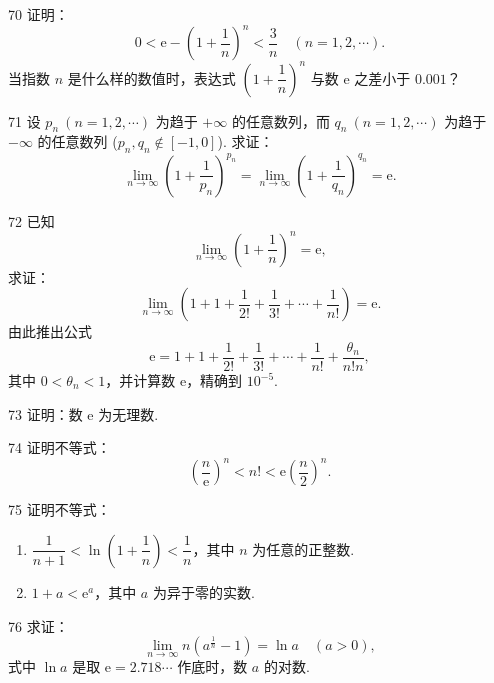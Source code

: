 \begin{prob}[M]{70}
证明：
\[
0 < \mathrm{e} - \left(1 + \frac{1}{n}\right)^n < \frac{3}{n} \quad (n=1,2,\cdots).
\]
当指数 $n$ 是什么样的数值时，表达式 $\left(1 + \dfrac{1}{n}\right)^n$ 与数 $\mathrm{e}$ 之差小于 $0.001$？
\end{prob}

\begin{prob}[M]{71}
设 $p_n\ (n=1,2,\cdots)$ 为趋于 $+\infty$ 的任意数列，而 $q_n\ (n=1,2,\cdots)$ 为趋于 $-\infty$ 的任意数列 ($p_n, q_n \notin [-1,0]$). 求证：
\[
\lim_{n\to\infty} \left(1 + \frac{1}{p_n}\right)^{p_n} = \lim_{n\to\infty} \left(1 + \frac{1}{q_n}\right)^{q_n} = \mathrm{e}.
\]
\end{prob}

\begin{prob}[L]{72}
已知
\[
\lim_{n\to\infty} \left(1 + \frac{1}{n}\right)^n = \mathrm{e},
\]
求证：
\[
\lim_{n\to\infty} \left(1 + 1 + \frac{1}{2!} + \frac{1}{3!} + \cdots + \frac{1}{n!}\right) = \mathrm{e}.
\]
由此推出公式
\[
\mathrm{e} = 1 + 1 + \frac{1}{2!} + \frac{1}{3!} + \cdots + \frac{1}{n!} + \frac{\theta_n}{n!n}, \tag{$*$}
\]
其中 $0 < \theta_n < 1$，并计算数 $\mathrm{e}$，精确到 $10^{-5}$.
\end{prob}

\begin{prob}[M]{73}
证明：数 $\mathrm{e}$ 为无理数.
\end{prob}

\begin{prob}[M]{74}
证明不等式：
\[
\left(\frac{n}{\mathrm{e}}\right)^n < n! < \mathrm{e}\left(\frac{n}{2}\right)^n.
\]
\end{prob}

\begin{prob}[M]{75}
证明不等式：
\begin{enumerate}[label=(\alph*), itemsep=2pt, topsep=3pt]
\item $\dfrac{1}{n+1} < \ln\left(1 + \dfrac{1}{n}\right) < \dfrac{1}{n}$，其中 $n$ 为任意的正整数.
\item $1 + a < \mathrm{e}^a$，其中 $a$ 为异于零的实数.
\end{enumerate}
\end{prob}

\begin{prob}[M]{76}
求证：
\[
\lim_{n\to\infty} n\left(a^{\frac{1}{n}} - 1\right) = \ln a \quad (a > 0),
\]
式中 $\ln a$ 是取 $\mathrm{e} = 2.718\cdots$ 作底时，数 $a$ 的对数.
\end{prob}

